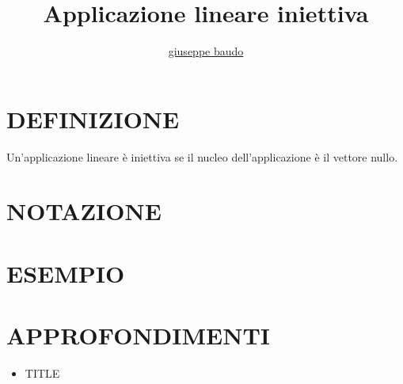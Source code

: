 \documentclass[a4paper,10pt]{article}
\title{Applicazione lineare iniettiva}
\author{\href{http://www.baudo.hol.es}{giuseppe baudo}}
\begin{document}
\maketitle

\section{DEFINIZIONE}
Un'applicazione lineare è iniettiva se il nucleo dell'applicazione è il vettore nullo.

\section{NOTAZIONE}

\section{ESEMPIO}

\section{APPROFONDIMENTI}
\begin{itemize}
 \item TITLE
\end{itemize}
\end{document}
